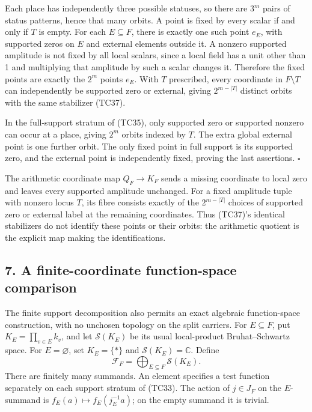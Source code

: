 \documentclass[
  10pt,
]{article}
\begin{document}
Each place has independently three possible statuses, so there are
\(3^m\) pairs of status patterns, hence that many orbits. A point is
fixed by every scalar if and only if \(T\) is empty. For each
\(E\subseteq F\), there is exactly one such point \(e_E\), with
supported zeros on \(E\) and external elements outside it. A nonzero
supported amplitude is not fixed by all local scalars, since a local
field has a unit other than 1 and multiplying that amplitude by such a
scalar changes it. Therefore the fixed points are exactly the \(2^m\)
points \(e_E\). With \(T\) prescribed, every coordinate in
\(F\setminus T\) can independently be supported zero or external, giving
\(2^{m-|T|}\) distinct orbits with the same stabilizer (TC37).

In the full-support stratum of (TC35), only supported zero or supported
nonzero can occur at a place, giving \(2^m\) orbits indexed by \(T\).
The extra global external point is one further orbit. The only fixed
point in full support is its supported zero, and the external point is
independently fixed, proving the last assertions. \(\square\)

The arithmetic coordinate map \(Q_F\to K_F\) sends a missing coordinate
to local zero and leaves every supported amplitude unchanged. For a
fixed amplitude tuple with nonzero locus \(T\), its fibre consists
exactly of the \(2^{m-|T|}\) choices of supported zero or external label
at the remaining coordinates. Thus (TC37)'s identical stabilizers do not
identify these points or their orbits: the arithmetic quotient is the
explicit map making the identifications.

\subsection{7. A finite-coordinate function-space
comparison}\label{a-finite-coordinate-function-space-comparison}

The finite support decomposition also permits an exact algebraic
function-space construction, with no unchosen topology on the split
carriers. For \(E\subseteq F\), put \(K_E=\prod_{v\in E}k_v\), and let
\(\mathcal S(K_E)\) be its usual local-product Bruhat--Schwartz space.
For \(E=\varnothing\), set \(K_E=\{*\}\) and
\(\mathcal S(K_E)=\mathbb C\). Define \[
\mathcal F_F=\bigoplus_{E\subseteq F}\mathcal S(K_E).
\tag{TC38}
\] There are finitely many summands. An element specifies a test
function separately on each support stratum of (TC33). The action of
\(j\in J_F\) on the \(E\)-summand is \(f_E(a)\mapsto f_E(j_E^{-1}a)\);
on the empty summand it is trivial.
\end{document}
